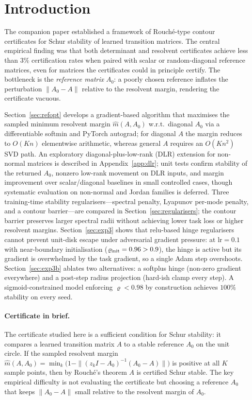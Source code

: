 \documentclass{article}
\theoremstyle{definition}
\newcommand{\norm}[1]{\left\|#1\right\|}
\begin{document}
\section{Introduction}
\label{sec:intro}

The companion paper established a framework of Rouch\'e-type contour
certificates for Schur stability of learned transition matrices.  The
central empirical finding was that both determinant and resolvent
certificates achieve less than 3\% certification rates when paired with
scalar or random-diagonal reference matrices, even for matrices the
certificates could in principle certify.  The bottleneck is the
\emph{reference matrix} $A_0$: a poorly chosen reference inflates the
perturbation $\norm{A_0 - A}$ relative to the resolvent margin,
rendering the certificate vacuous.

Section~\ref{sec:refopt} develops a gradient-based algorithm that maximises
the sampled minimum resolvent margin $\hat{m}(A, A_0)$ w.r.t.\ diagonal
$A_0$ via a differentiable softmin and PyTorch autograd; for diagonal $A$
the margin reduces to $O(Kn)$ elementwise arithmetic, whereas general $A$
requires an $O(Kn^2)$ SVD path.  An exploratory diagonal-plus-low-rank (DLR)
extension for non-normal matrices is described in Appendix~\ref{app:dlr};
unit tests confirm stability of the returned $A_0$, nonzero low-rank
movement on DLR inputs, and margin improvement over scalar/diagonal
baselines in small controlled cases, though systematic evaluation on
non-normal and Jordan families is deferred.  Three training-time stability
regularisers---spectral penalty, Lyapunov per-mode penalty, and a contour
barrier---are compared in Section~\ref{sec:regularisers}; the contour barrier
preserves larger spectral radii without achieving lower task loss or higher
resolvent margins.  Section~\ref{sec:exp3} shows that relu-based hinge
regularisers cannot prevent unit-disk escape under adversarial gradient
pressure: at $\mathrm{lr}=0.1$ with near-boundary initialisation
($\varrho_{\rm init}=0.96>0.9$), the hinge is active but its gradient is
overwhelmed by the task gradient, so a single Adam step overshoots.  Section~\ref{sec:exp3b}
ablates two alternatives: a softplus hinge (non-zero gradient everywhere) and
a post-step radius projection (hard-ish clamp every step).  A
sigmoid-constrained model enforcing $\varrho < 0.98$ by construction achieves
$100\%$ stability on every seed.

\paragraph{Certificate in brief.}
The certificate studied here is a sufficient condition for Schur
stability: it compares a learned transition matrix $A$ to a stable
reference $A_0$ on the unit circle.  If the sampled resolvent margin
$\hat{m}(A,A_0)=\min_{k}\bigl(1-\|(z_k I-A_0)^{-1}(A_0-A)\|\bigr)$ is
positive at all $K$ sample points, then by Rouch\'e's theorem $A$ is
certified Schur stable.  The key empirical difficulty is not evaluating
the certificate but choosing a reference $A_0$ that keeps $\|A_0-A\|$
small relative to the resolvent margin of $A_0$.
\end{document}
